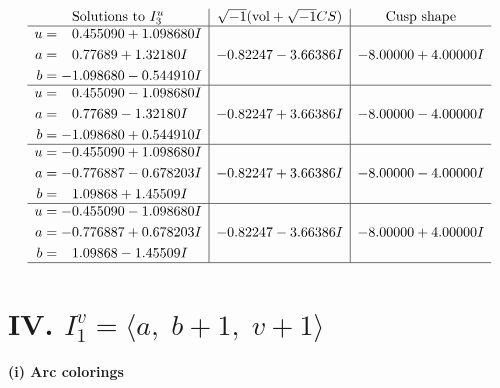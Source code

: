 \documentclass[1p]{elsarticle_modified}
\theoremstyle{definition}
\newcommand{\I}{\sqrt{-1}}
\begin{document}
$$\begin{array}{c|c|c}  
\text{Solutions to }I^u_{3}& \I (\text{vol} + \sqrt{-1}CS) & \text{Cusp shape}\\
 \hline 
\begin{aligned}
u &= \phantom{-}0.455090 + 1.098680 I \\
a &= \phantom{-}0.77689 + 1.32180 I \\
b &= -1.098680 - 0.544910 I\end{aligned}
 & -0.82247 - 3.66386 I & -8.00000 + 4.00000 I \\ \hline\begin{aligned}
u &= \phantom{-}0.455090 - 1.098680 I \\
a &= \phantom{-}0.77689 - 1.32180 I \\
b &= -1.098680 + 0.544910 I\end{aligned}
 & -0.82247 + 3.66386 I & -8.00000 - 4.00000 I \\ \hline\begin{aligned}
u &= -0.455090 + 1.098680 I \\
a &= -0.776887 - 0.678203 I \\
b &= \phantom{-}1.09868 + 1.45509 I\end{aligned}
 & -0.82247 + 3.66386 I & -8.00000 - 4.00000 I \\ \hline\begin{aligned}
u &= -0.455090 - 1.098680 I \\
a &= -0.776887 + 0.678203 I \\
b &= \phantom{-}1.09868 - 1.45509 I\end{aligned}
 & -0.82247 - 3.66386 I & -8.00000 + 4.00000 I\\
 \hline 
 \end{array}$$\newpage\newpage\renewcommand{\arraystretch}{1}
\centering \section*{IV. $I^v_{1}= \langle a,\;b+1,\;v+1 \rangle$}
\flushleft \textbf{(i) Arc colorings}\\
\end{document}
